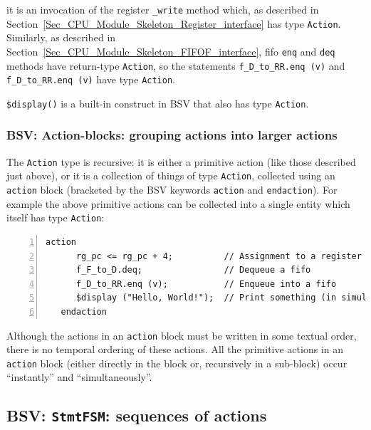 {\ie} it is an invocation of the register \verb|_write| method which,
as described in
Section~\ref{Sec_CPU_Module_Skeleton_Register_interface} has type
\verb|Action|.  Similarly, as described in
Section~\ref{Sec_CPU_Module_Skeleton_FIFOF_interface}, fifo \verb|enq|
and \verb|deq| methods have return-type \verb|Action|, so the
statements \verb|f_D_to_RR.enq (v)| and \verb|f_D_to_RR.enq (v)| have
type \verb|Action|.


\verb|$display()| is a built-in construct in BSV that also has type
\verb|Action|.


\subsubsection{BSV: Action-blocks: grouping actions into larger actions}

The \verb|Action| type is recursive: it is either a primitive action
(like those described just above), or it is a collection of things of
type \verb|Action|, collected using an \verb|action| block (bracketed
by the BSV keywords \verb|action| and \verb|endaction|).  For example
the above primitive actions can be collected into a single entity
which itself has type \verb|Action|:

\begin{Verbatim}[frame=single, numbers=left]
   action
      rg_pc <= rg_pc + 4;          // Assignment to a register
      f_F_to_D.deq;                // Dequeue a fifo
      f_D_to_RR.enq (v);           // Enqueue into a fifo
      $display ("Hello, World!");  // Print something (in simulation only)
   endaction
\end{Verbatim}

Although the actions in an \verb|action| block must be written in some
textual order, there is no temporal ordering of these actions.  All
the primitive actions in an \verb|action| block (either directly in
the block or, recursively in a sub-block) occur ``instantly'' and
``simultaneously''.


\subsection{BSV: {\tt StmtFSM}: sequences of actions}

